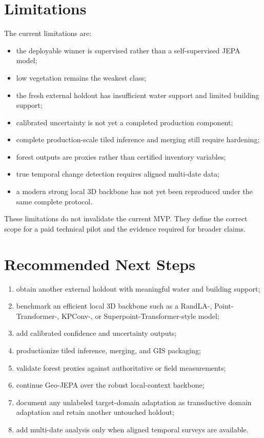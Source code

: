 \documentclass[11pt,a4paper]{article}
\begin{document}
\section{Limitations}

The current limitations are:

\begin{itemize}
  \item the deployable winner is supervised rather than a self-supervised JEPA model;
  \item low vegetation remains the weakest class;
  \item the fresh external holdout has insufficient water support and limited building support;
  \item calibrated uncertainty is not yet a completed production component;
  \item complete production-scale tiled inference and merging still require hardening;
  \item forest outputs are proxies rather than certified inventory variables;
  \item true temporal change detection requires aligned multi-date data;
  \item a modern strong local 3D backbone has not yet been reproduced under the same complete protocol.
\end{itemize}

These limitations do not invalidate the current MVP. They define the correct scope for a paid technical pilot and the evidence required for broader claims.

\section{Recommended Next Steps}

\begin{enumerate}
  \item obtain another external holdout with meaningful water and building support;
  \item benchmark an efficient local 3D backbone such as a RandLA-, Point-Transformer-, KPConv-, or Superpoint-Transformer-style model;
  \item add calibrated confidence and uncertainty outputs;
  \item productionize tiled inference, merging, and GIS packaging;
  \item validate forest proxies against authoritative or field measurements;
  \item continue Geo-JEPA over the robust local-context backbone;
  \item document any unlabeled target-domain adaptation as transductive domain adaptation and retain another untouched holdout;
  \item add multi-date analysis only when aligned temporal surveys are available.
\end{enumerate}
\end{document}
